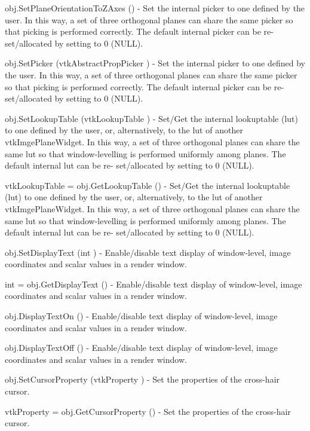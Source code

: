 \begin{DoxyItemize}
\item {\ttfamily obj.\-Set\-Plane\-Orientation\-To\-Z\-Axes ()} -\/ Set the internal picker to one defined by the user. In this way, a set of three orthogonal planes can share the same picker so that picking is performed correctly. The default internal picker can be re-\/set/allocated by setting to 0 (N\-U\-L\-L).  
\item {\ttfamily obj.\-Set\-Picker (vtk\-Abstract\-Prop\-Picker )} -\/ Set the internal picker to one defined by the user. In this way, a set of three orthogonal planes can share the same picker so that picking is performed correctly. The default internal picker can be re-\/set/allocated by setting to 0 (N\-U\-L\-L).  
\item {\ttfamily obj.\-Set\-Lookup\-Table (vtk\-Lookup\-Table )} -\/ Set/\-Get the internal lookuptable (lut) to one defined by the user, or, alternatively, to the lut of another vtk\-Imge\-Plane\-Widget. In this way, a set of three orthogonal planes can share the same lut so that window-\/levelling is performed uniformly among planes. The default internal lut can be re-\/ set/allocated by setting to 0 (N\-U\-L\-L).  
\item {\ttfamily vtk\-Lookup\-Table = obj.\-Get\-Lookup\-Table ()} -\/ Set/\-Get the internal lookuptable (lut) to one defined by the user, or, alternatively, to the lut of another vtk\-Imge\-Plane\-Widget. In this way, a set of three orthogonal planes can share the same lut so that window-\/levelling is performed uniformly among planes. The default internal lut can be re-\/ set/allocated by setting to 0 (N\-U\-L\-L).  
\item {\ttfamily obj.\-Set\-Display\-Text (int )} -\/ Enable/disable text display of window-\/level, image coordinates and scalar values in a render window.  
\item {\ttfamily int = obj.\-Get\-Display\-Text ()} -\/ Enable/disable text display of window-\/level, image coordinates and scalar values in a render window.  
\item {\ttfamily obj.\-Display\-Text\-On ()} -\/ Enable/disable text display of window-\/level, image coordinates and scalar values in a render window.  
\item {\ttfamily obj.\-Display\-Text\-Off ()} -\/ Enable/disable text display of window-\/level, image coordinates and scalar values in a render window.  
\item {\ttfamily obj.\-Set\-Cursor\-Property (vtk\-Property )} -\/ Set the properties of the cross-\/hair cursor.  
\item {\ttfamily vtk\-Property = obj.\-Get\-Cursor\-Property ()} -\/ Set the properties of the cross-\/hair cursor.  

\end{DoxyItemize}
